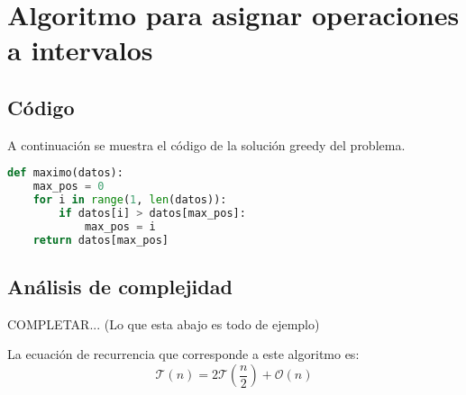 \section{Algoritmo para asignar operaciones a intervalos}

\subsection{Código}

A continuación se muestra el código de la solución greedy del problema. 

\begin{lstlisting}[language=Python]
def maximo(datos):
    max_pos = 0
    for i in range(1, len(datos)):
        if datos[i] > datos[max_pos]:
            max_pos = i
    return datos[max_pos]
\end{lstlisting}


% 




\subsection{Análisis de complejidad}

COMPLETAR... (Lo que esta abajo es todo de ejemplo)

La ecuación de recurrencia que corresponde a este algoritmo es: 
\begin{equation*} %
    \mathcal{T}(n) = 2 \mathcal{T}\left(\frac{n}{2}\right) + \mathcal{O}(n)
\end{equation*}

